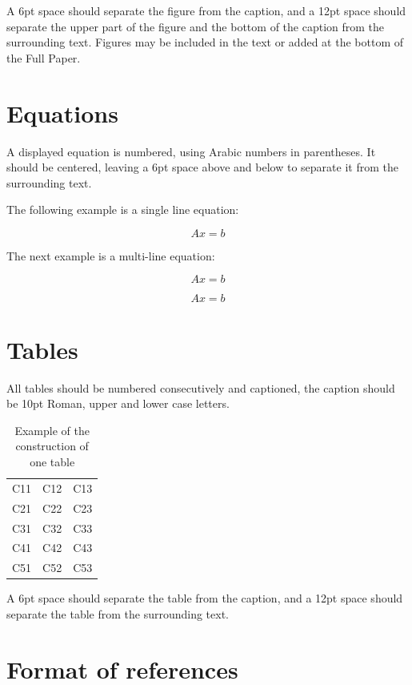 \documentclass{WCCM-ECCOMAS_2026_Full_Paper}
\begin{document}
A 6pt space should separate the figure from the caption, and a 12pt space should separate the upper part of the figure and the bottom of the caption from the surrounding text.
Figures may be included in the text or added at the bottom of the Full Paper.

\section{Equations}

A displayed equation is numbered, using Arabic numbers in parentheses. It should be centered, leaving a 6pt space above and below to separate it from the surrounding text.

The following example is a single line equation:

\begin{equation}
Ax=b
\end{equation}

The next example is a multi-line equation:

\begin{equation}
Ax=b
\end{equation}

\[
Ax=b
\]

\section{Tables}

All tables should be numbered consecutively and captioned, the caption should be 10pt Roman, upper and lower case letters.

\begin{table}[h!]
\centering
\caption{Example of the construction of one table}
\begin{tabular}{ccc}
\toprule
C11 & C12 & C13 \\
C21 & C22 & C23 \\
C31 & C32 & C33 \\
C41 & C42 & C43 \\
C51 & C52 & C53 \\
\bottomrule
\end{tabular}
\end{table}

A 6pt space should separate the table from the caption, and a 12pt space should separate the table from the surrounding text.

\section{Format of references}
\end{document}
